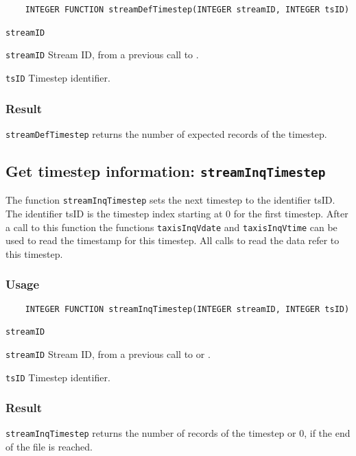 \begin{verbatim}
    INTEGER FUNCTION streamDefTimestep(INTEGER streamID, INTEGER tsID)
\end{verbatim}

\hspace*{4mm}\begin{minipage}[]{15cm}
\begin{deflist}{\texttt{streamID}\ }
\item[\texttt{streamID}]
Stream ID, from a previous call to {}.
\item[\texttt{tsID}]
Timestep identifier.

\end{deflist}
\end{minipage}

\subsubsection*{Result}

{\texttt{streamDefTimestep}} returns the number of expected records of the timestep.



\subsection{Get timestep information: \texttt{streamInqTimestep}}
\label{streamInqTimestep}

The function {\texttt{streamInqTimestep}} sets the next timestep to the identifier tsID.
The identifier tsID is the timestep index starting at 0 for the first timestep.
After a call to this function the functions {\texttt{taxisInqVdate}} and {\texttt{taxisInqVtime}} can be used
to read the timestamp for this timestep. All calls to read the data refer to this timestep.

\subsubsection*{Usage}

\begin{verbatim}
    INTEGER FUNCTION streamInqTimestep(INTEGER streamID, INTEGER tsID)
\end{verbatim}

\hspace*{4mm}\begin{minipage}[]{15cm}
\begin{deflist}{\texttt{streamID}\ }
\item[\texttt{streamID}]
Stream ID, from a previous call to {} or {}.
\item[\texttt{tsID}]
Timestep identifier.

\end{deflist}
\end{minipage}

\subsubsection*{Result}

{\texttt{streamInqTimestep}} returns the number of records of the timestep or 0, if the end of the file is reached.

